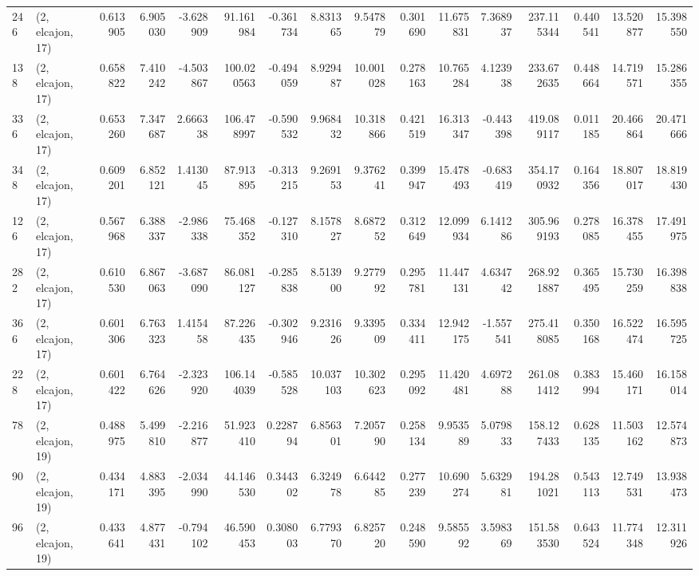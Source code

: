 \begin{tabular}{llrrrrrrrrrrrrrr}
246 &  (2, elcajon, 17) &   0.613905 &   6.905030 &  -3.628909 &    91.161984 &  -0.361734 &   8.831365 &   9.547879 &  0.301690 &  11.675831 &   7.368937 &   237.115344 &  0.440541 &  13.520877 &  15.398550 \\
138 &  (2, elcajon, 17) &   0.658822 &   7.410242 &  -4.503867 &   100.020563 &  -0.494059 &   8.929487 &  10.001028 &  0.278163 &  10.765284 &   4.123938 &   233.672635 &  0.448664 &  14.719571 &  15.286355 \\
336 &  (2, elcajon, 17) &   0.653260 &   7.347687 &   2.666338 &   106.478997 &  -0.590532 &   9.968432 &  10.318866 &  0.421519 &  16.313347 &  -0.443398 &   419.089117 &  0.011185 &  20.466864 &  20.471666 \\
348 &  (2, elcajon, 17) &   0.609201 &   6.852121 &   1.413045 &    87.913895 &  -0.313215 &   9.269153 &   9.376241 &  0.399947 &  15.478493 &  -0.683419 &   354.170932 &  0.164356 &  18.807017 &  18.819430 \\
126 &  (2, elcajon, 17) &   0.567968 &   6.388337 &  -2.986338 &    75.468352 &  -0.127310 &   8.157827 &   8.687252 &  0.312649 &  12.099934 &   6.141286 &   305.969193 &  0.278085 &  16.378455 &  17.491975 \\
282 &  (2, elcajon, 17) &   0.610530 &   6.867063 &  -3.687090 &    86.081127 &  -0.285838 &   8.513900 &   9.277992 &  0.295781 &  11.447131 &   4.634742 &   268.921887 &  0.365495 &  15.730259 &  16.398838 \\
366 &  (2, elcajon, 17) &   0.601306 &   6.763323 &   1.415458 &    87.226435 &  -0.302946 &   9.231626 &   9.339509 &  0.334411 &  12.942175 &  -1.557541 &   275.418085 &  0.350168 &  16.522474 &  16.595725 \\
228 &  (2, elcajon, 17) &   0.601422 &   6.764626 &  -2.323920 &   106.144039 &  -0.585528 &  10.037103 &  10.302623 &  0.295092 &  11.420481 &   4.697288 &   261.081412 &  0.383994 &  15.460171 &  16.158014 \\
78  &  (2, elcajon, 19) &   0.488975 &   5.499810 &  -2.216877 &    51.923410 &   0.228794 &   6.856301 &   7.205790 &  0.258134 &   9.953589 &   5.079833 &   158.127433 &  0.628135 &  11.503162 &  12.574873 \\
90  &  (2, elcajon, 19) &   0.434171 &   4.883395 &  -2.034990 &    44.146530 &   0.344302 &   6.324978 &   6.644285 &  0.277239 &  10.690274 &   5.632981 &   194.281021 &  0.543113 &  12.749531 &  13.938473 \\
96  &  (2, elcajon, 19) &   0.433641 &   4.877431 &  -0.794102 &    46.590453 &   0.308003 &   6.779370 &   6.825720 &  0.248590 &   9.585592 &   3.598369 &   151.583530 &  0.643524 &  11.774348 &  12.311926 \\

\end{tabular}
